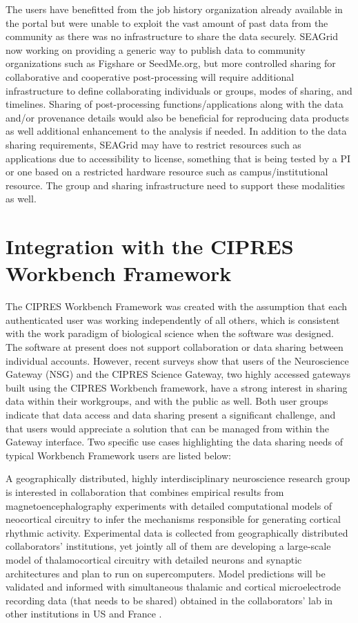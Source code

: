 \documentclass[sigconf]{acmart}
\begin{document}
The users have benefitted from the job history organization already available in the portal but were unable to exploit the vast amount of past data from the community as there was no infrastructure to share the data securely. SEAGrid now working on providing a generic way to publish data to community organizations such as Figshare or SeedMe.org, but more controlled sharing for collaborative and cooperative post-processing will require additional infrastructure to define collaborating individuals or groups, modes of sharing, and timelines. Sharing of post-processing functions/applications along with the data and/or provenance details would also be beneficial for reproducing data products as well additional enhancement to the analysis if needed.
In addition to the data sharing requirements, SEAGrid may have to restrict resources such as applications due to accessibility to license, something that is being tested by a PI  or one  based on a restricted hardware resource such as campus/institutional  resource. The group and sharing infrastructure need to support these modalities as well. 

\section{Integration with the CIPRES Workbench Framework}\label{nsg}

The CIPRES Workbench Framework \cite{miller2015cipres} was created with the assumption that each authenticated user was working independently of all others, which is consistent with the work paradigm of biological science when the software was designed. The software at present does not support collaboration or data sharing between individual accounts. However, recent surveys show that users of the Neuroscience Gateway (NSG) and the CIPRES Science Gateway, two highly accessed gateways built using the CIPRES Workbench framework, have a strong interest in sharing data within their workgroups, and with the public as well. Both user groups indicate that data access and data sharing present a significant challenge, and that users would appreciate a solution that can be managed from within the Gateway interface. Two specific use cases highlighting the data sharing needs of typical Workbench Framework users  are listed below:

A geographically distributed, highly interdisciplinary neuroscience research group is interested in collaboration that combines empirical results from magnetoencephalography  experiments with detailed computational models of neocortical circuitry to infer the mechanisms responsible for generating cortical rhythmic activity. Experimental data is collected from geographically distributed collaborators' institutions, yet jointly all of them are developing a large-scale model of thalamocortical circuitry with detailed neurons and synaptic architectures and plan to run on supercomputers. Model predictions will be validated and informed with simultaneous thalamic and cortical microelectrode recording data (that needs to be shared) obtained in the collaborators' lab in other institutions in US and France \cite{delorme2004eeglab}. 
\end{document}
